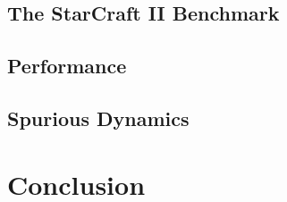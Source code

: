 \documentclass{article}
\begin{document}
\begin{multicols}{2}
\subsection{The StarCraft II Benchmark}

\subsection{Performance}

\subsection{Spurious Dynamics}


\section{Conclusion}


 
\footnotesize{}
\end{multicols}

\end{document}
